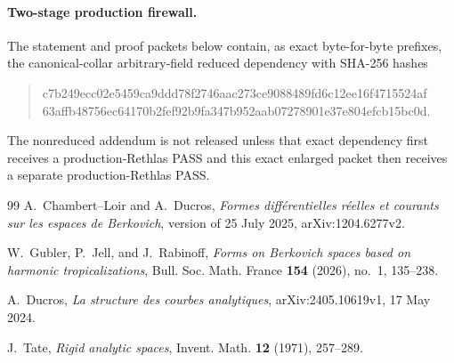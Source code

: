 \documentclass[11pt]{article}
\theoremstyle{remark}
\begin{document}
\paragraph{Two-stage production firewall.}
The statement and proof packets below contain, as exact byte-for-byte
prefixes, the canonical-collar arbitrary-field reduced dependency with
SHA-256 hashes
\begin{quote}
\small\ttfamily
c7b249ecc02e5459ca9ddd78f2746aac273ce9088489fd6c12ee16f4715524af\\
63affb48756ec64170b2fef92b9fa347b952aab07278901e37e804efcb15bc0d.
\end{quote}
The nonreduced addendum is not released unless that exact dependency first
receives a production-Rethlas PASS and this exact enlarged packet then
receives a separate production-Rethlas PASS.




\begin{thebibliography}{99}
A.~Chambert--Loir and A.~Ducros,
\emph{Formes diff\'erentielles r\'eelles et courants sur les espaces de
Berkovich}, version of 25 July 2025, arXiv:1204.6277v2.

W.~Gubler, P.~Jell, and J.~Rabinoff,
\emph{Forms on Berkovich spaces based on harmonic tropicalizations},
Bull. Soc. Math. France \textbf{154} (2026), no.~1, 135--238.

A.~Ducros,
\emph{La structure des courbes analytiques},
arXiv:2405.10619v1, 17 May 2024.

J.~Tate,
\emph{Rigid analytic spaces},
Invent. Math. \textbf{12} (1971), 257--289.
\end{thebibliography}
\end{document}
